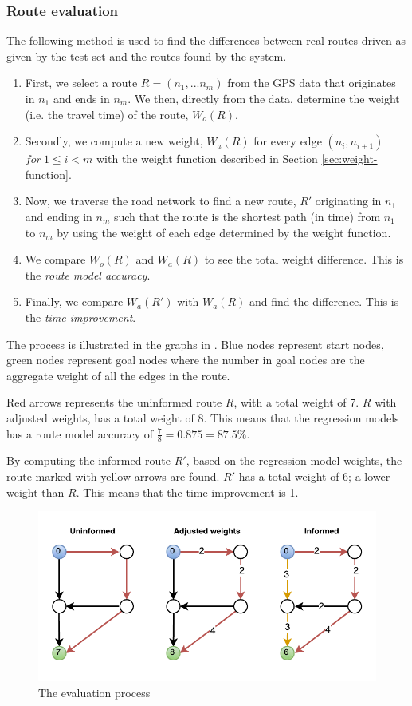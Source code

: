 \subsubsection{Route evaluation}
The following method is used to find the differences between real routes driven as given by the test-set and the routes found by the system.
\begin{enumerate}
\item First, we select a route $R=(n_1,...n_m)$ from the GPS data that originates in $n_1$ and ends in $n_m$. We then, directly from the data, determine the weight (i.e. the travel time) of the route, $W_o(R)$.
\item Secondly, we compute a new weight, $W_{a}(R)$ for every edge $(n_i,n_{i+1})$ $for \  1 \leq i < m$ with the weight function described in Section \ref{sec:weight-function}.
\item Now, we traverse the road network to find a new route, $R'$ originating in $n_1$ and ending in $n_m$ such that the route is the shortest path (in time) from $n_1$ to $n_m$ by using the weight of each edge determined by the weight function.
\item We compare $W_o(R)$ and $W_a(R)$ to see the total weight difference. This is the \emph{route model accuracy}.
\item Finally, we compare $W_a(R')$ with $W_a(R)$ and find the difference. This is the \emph{time improvement}.
\end{enumerate}
The process is illustrated in the graphs in . Blue nodes represent start nodes, green nodes represent goal nodes where the number in goal nodes are the aggregate weight of all the edges in the route. 

Red arrows represents the uninformed route $R$, with a total weight of 7. $R$ with adjusted weights, has a total weight of 8. This means that the regression models has a route model accuracy of $\frac{7}{8}=0.875=87.5\%$. 

By computing the informed route $R'$, based on the regression model weights, the route marked with yellow arrows are found. $R'$ has a total weight of 6; a lower weight than $R$. This means that the time improvement is 1.

\begin{figure}
\centering
\includegraphics[width=\textwidth]{figures/eval.pdf}
\caption{The evaluation process}
\label{fig:eval}
\end{figure}

